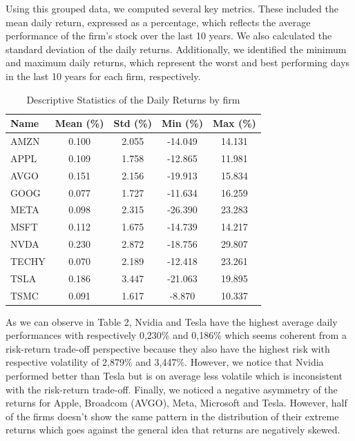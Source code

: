 \documentclass[12pt, oneside]{article}
\begin{document}
Using this grouped data, we computed several key metrics. These included the mean daily return, expressed as a percentage, which reflects the average performance of the firm's stock over the last 10 years. We also calculated the standard deviation of the daily returns. Additionally, we identified the minimum and maximum daily returns, which represent the worst and best performing days in the last 10 years for each firm, respectively. 

\begin{table}[ht]
    \centering
    \begin{tabular}{lcccc}
        \toprule
        \textbf{Name} & \textbf{Mean (\%)} & \textbf{Std (\%)} & \textbf{Min (\%)} & \textbf{Max (\%)} \\
        \midrule
        AMZN  & 0.100 & 2.055 & -14.049 & 14.131 \\
        APPL  & 0.109 & 1.758 & -12.865 & 11.981 \\
        AVGO  & 0.151 & 2.156 & -19.913 & 15.834 \\
        GOOG  & 0.077 & 1.727 & -11.634 & 16.259 \\
        META  & 0.098 & 2.315 & -26.390 & 23.283 \\
        MSFT  & 0.112 & 1.675 & -14.739 & 14.217 \\
        NVDA  & 0.230 & 2.872 & -18.756 & 29.807 \\
        TECHY & 0.070 & 2.189 & -12.418 & 23.261 \\
        TSLA  & 0.186 & 3.447 & -21.063 & 19.895 \\
        TSMC  & 0.091 & 1.617 & -8.870  & 10.337 \\
        \bottomrule
    \end{tabular}
    \caption{Descriptive Statistics of the Daily Returns  by firm}
    \label{tab:returns_stats}
\end{table}


As we can observe in Table 2, Nvidia and Tesla have the highest average daily performances with respectively 0,230\% and 0,186\% which seems coherent from a risk-return trade-off perspective because they also have the highest risk with respective volatility of 2,879\% and 3,447\%. However, we notice that Nvidia performed better than Tesla but is on average less volatile which is inconsistent with the risk-return trade-off. Finally, we noticed a negative asymmetry of the returns for Apple, Broadcom (AVGO), Meta, Microsoft and Tesla. However, half of the firms doesn't show the same pattern in the distribution of their extreme returns which goes against the general idea that returns are negatively skewed.
\end{document}
